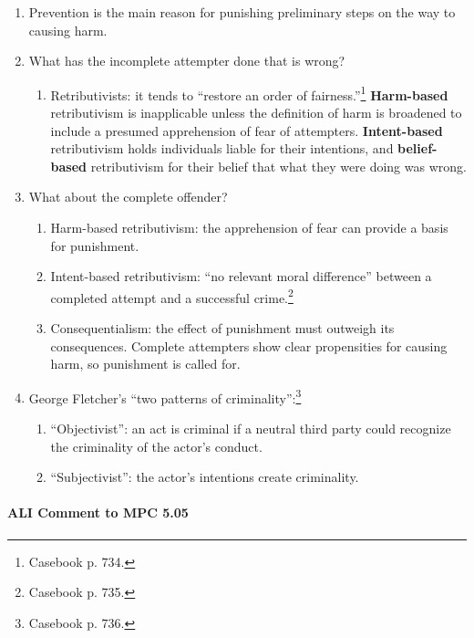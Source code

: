 \begin{enumerate}
    \item Prevention is the main reason for punishing preliminary steps on the 
    way to causing harm.
    \item What has the incomplete attempter done that is wrong?
    \begin{enumerate}
        \item Retributivists: it tends to ``restore an order of 
        fairness.''\footnote{Casebook p. 734.} \textbf{Harm-based} 
        retributivism is inapplicable unless the definition of harm is 
        broadened to include a presumed apprehension of fear of attempters. 
        \textbf{Intent-based} retributivism holds individuals liable for their 
        intentions, and \textbf{belief-based} retributivism for their belief 
        that what they were doing was wrong.
    \end{enumerate}
    \item What about the complete offender?
    \begin{enumerate}
        \item Harm-based retributivism: the apprehension of fear can provide a 
        basis for punishment.
        \item Intent-based retributivism: ``no relevant moral difference'' 
        between a completed attempt and a successful crime.\footnote{Casebook 
        p.  735.}
        \item Consequentialism: the effect of punishment must outweigh its 
        consequences. Complete attempters show clear propensities for causing 
        harm, so punishment is called for.
    \end{enumerate}
    \item George Fletcher's ``two patterns of criminality'':\footnote{Casebook 
    p. 736.}
    \begin{enumerate}
        \item ``Objectivist'': an act is criminal if a neutral third party 
        could recognize the criminality of the actor's conduct.
        \item ``Subjectivist'': the actor's intentions create criminality.
    \end{enumerate}
\end{enumerate}

\paragraph{ALI Comment to MPC 5.05}


